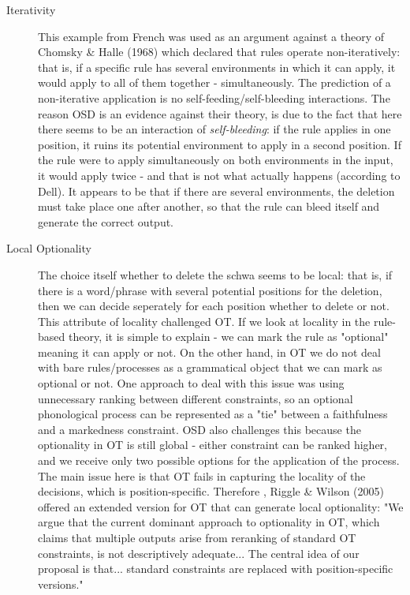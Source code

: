 \documentclass{article}
\begin{document}
\begin{description}
   \item[Iterativity] This example from French was used as an argument against a theory of Chomsky \& Halle (1968) which declared that rules operate non-iteratively: that is, if a specific rule has several environments in which it can apply, it would apply to all of them together - simultaneously.  The prediction of a non-iterative application is no self-feeding/self-bleeding interactions. The reason OSD is an evidence against their theory, is due to the fact that here there seems to be an interaction of \textit{self-bleeding}: if the rule applies in one position, it ruins its potential environment to apply in a second position. If the rule were to apply simultaneously on both environments in the input, it would apply twice - and that is not what actually happens (according to Dell). It appears to be that if there are several environments, the deletion must take place one after another, so that the rule can bleed itself and generate the correct output.

   \item[Local Optionality] The choice itself whether to delete the schwa seems to be local: that is, if there is a word/phrase with several potential positions for the deletion, then we can decide seperately for each position whether to delete or not. This attribute of locality challenged OT.
If we look at locality in the rule-based theory, it is simple to explain - we can mark the rule as "optional" meaning it can apply or not. On the other hand, in OT we do not deal with bare rules/processes as a grammatical object that we can mark as optional or not. One approach to deal with this issue was using unnecessary ranking between different constraints, so an optional phonological process can be represented as a "tie" between a faithfulness and a markedness constraint.  OSD also challenges this because the optionality in OT is still global - either constraint can be ranked higher, and we receive only two possible options for the application of the process. The main issue here is that OT fails in capturing the locality of the decisions, which is position-specific. Therefore , Riggle \& Wilson (2005) offered an extended version for OT that can generate local optionality: "We argue that the current dominant approach to optionality in OT,  which claims that multiple outputs arise from reranking of standard OT constraints,  is not descriptively adequate... The central idea of our proposal is that... standard constraints are replaced with position-specific versions."
\end{description}
\end{document}
